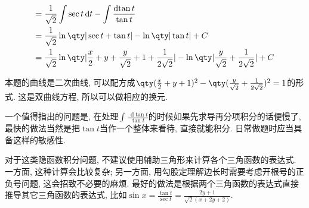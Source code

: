 \documentclass{ctexbook}
\newcommand*{\dif}{\mathop{}\!\mathrm{d}}
\begin{document}
{\begin{align*}
={}&\frac{1}{\sqrt{2}}\int\sec{t}\dif{t}-\int\frac{\dif{\tan{t}}}{\tan{t}}\\
={}&\frac{1}{\sqrt{2}}\ln\qty|\sec{t}+\tan{t}|-\ln\qty|\tan{t}|+C\\
={}&\frac{1}{\sqrt{2}}\ln\qty|\frac{x}{2}+y+\frac{y}{\sqrt{2}}+1+\frac{1}{2\sqrt{2}}|-\ln\qty|\frac{y}{\sqrt{2}}+\frac{1}{2\sqrt{2}}|+C
\end{align*}\par
{\kaishu 本题的曲线是二次曲线, 可以配方成$\qty(\frac{x}{2}+y+1)^{2}-\qty(\frac{y}{\sqrt{2}}+\frac{1}{2\sqrt{2}})^{2}=1$的形式. 这是双曲线方程, 所以可以做相应的换元. \par
一个值得指出的问题是, 在处理$\int\frac{\dif{\tan{t}}}{\tan{t}}$的时候如果先求导再分项积分的话便慢了, 最快的做法当然是把$\tan{t}$当作一个整体来看待, 直接就能积分. 日常做题时应当具备这样的敏感性. \par
对于这类隐函数积分问题, 不建议使用辅助三角形来计算各个三角函数的表达式. 一方面, 这种计算会比较复杂; 另一方面, 用勾股定理解边长时需要考虑开根号的正负号问题, 这会招致不必要的麻烦. 最好的做法是根据两个三角函数的表达式直接推导其它三角函数的表达式, 比如$\sin{x}=\frac{\tan{t}}{\sec{t}}=\frac{2y+1}{\sqrt{2}(x+2y+2)}$. \par}
}
\end{document}

